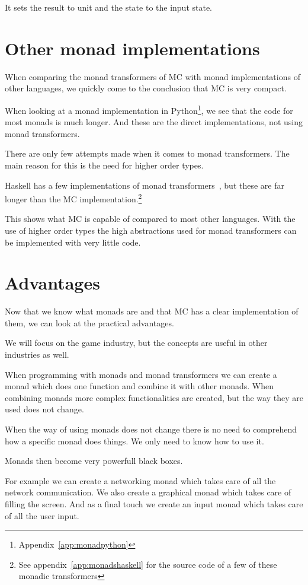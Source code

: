 It sets the result to unit and the state to the input state.


\section{Other monad implementations}
When comparing the monad transformers of MC with monad implementations of other languages, we quickly come to the conclusion that MC is very compact.

When looking at a monad implementation in Python\footnote{Appendix~\ref{app:monadpython}}, we see that the code for most monads is much longer.
And these are the direct implementations, not using monad transformers.

There are only few attempts made when it comes to monad transformers.
The main reason for this is the need for higher order types.

Haskell has a few implementations of monad transformers~\cite{monadshaskell}, but these are far longer than the MC implementation.\footnote{See appendix~\ref{app:monadshaskell} for the source code of a few of these monadic transformers}

This shows what MC is capable of compared to most other languages.
With the use of higher order types the high abstractions used for monad transformers can be implemented with very little code.


\section{Advantages}
Now that we know what monads are and that MC has a clear implementation of them, we can look at the practical advantages.

We will focus on the game industry, but the concepts are useful in other industries as well.

When programming with monads and monad transformers we can create a monad which does one function and combine it with other monads.
When combining monads more complex functionalities are created, but the way they are used does not change.

When the way of using monads does not change there is no need to comprehend how a specific monad does things.
We only need to know how to use it.

Monads then become very powerfull black boxes.

For example we can create a networking monad which takes care of all the network communication.
We also create a graphical monad which takes care of filling the screen.
And as a final touch we create an input monad which takes care of all the user input.

